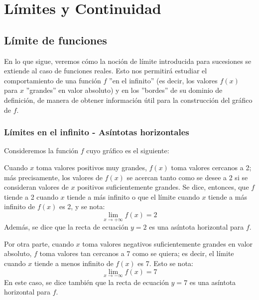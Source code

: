 \documentclass[../teoria.root.tex]{subfiles}
\begin{document}
\section{Límites y Continuidad}
\subsection{Límite de funciones}
En lo que sigue, veremos cómo la noción de límite introducida para sucesiones se extiende al caso de funciones reales.
Esto nos permitirá estudiar el comportamiento de una función \(f\) ”en el infinito” (es decir, los valores \(f(x)\) para \(x\) ”grandes” en valor absoluto) y en los ”bordes” de su dominio de definición, de manera de obtener información útil para la construcción del gráfico de \(f\).
\subsubsection{Límites en el infinito - Asíntotas horizontales}
Consideremos la función \(f\) cuyo gráfico es el siguiente:
\begin{center}
\end{center}
Cuando \(x\) toma valores positivos muy grandes, \(f(x)\) toma valores cercanos a 2;
más precisamente, los valores de \(f(x)\) se acercan tanto como se desee a 2 si se consideran valores de \(x\) positivos suficientemente grandes.
Se dice, entonces, que \(f\) tiende a 2 cuando \(x\) tiende a más infinito o que el límite cuando \(x\) tiende a más infinito de \(f(x)\) es 2, y se nota:
\[\lim_{x\to+\infty}f(x)=2\]
Además, se dice que la recta de ecuación \(y=2\) es una asíntota horizontal para \(f\).

Por otra parte, cuando \(x\) toma valores negativos suficientemente grandes en valor absoluto, \(f\) toma valores tan cercanos a 7 como se quiera;
es decir, el límite cuando \(x\) tiende a menos infinito de \(f(x)\) es 7.
Esto se nota:
\[\lim_{x\to-\infty}f(x)=7\]
En este caso, se dice también que la recta de ecuación \(y=7\) es una asíntota horizontal para \(f\).
\end{document}
